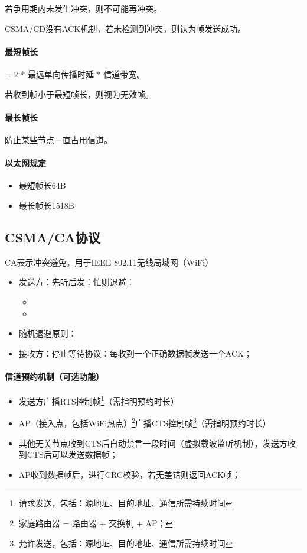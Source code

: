 若争用期内未发生冲突，则不可能再冲突。

CSMA/CD没有ACK机制，若未检测到冲突，则认为帧发送成功。

\paragraph{最短帧长}
= 2 * 最远单向传播时延 * 信道带宽。

若收到帧小于最短帧长，则视为无效帧。

\paragraph{最长帧长}
防止某些节点一直占用信道。

\paragraph{以太网规定}
\begin{itemize}
    \item 最短帧长64B
    \item 最长帧长1518B
\end{itemize}


\subsection{CSMA/CA协议}
CA表示冲突避免。用于IEEE 802.11无线局域网（WiFi）

\begin{itemize}
    \item 发送方：先听后发：忙则退避：\begin{itemize}
        \item 
        \item 
    \end{itemize}
    \item 随机退避原则：
    \item 接收方：停止等待协议：每收到一个正确数据帧发送一个ACK；
\end{itemize}

\paragraph{信道预约机制（可选功能）}
\begin{itemize}
    \item 发送方广播RTS控制帧\footnote{请求发送，包括：源地址、目的地址、通信所需持续时间}（需指明预约时长）
    \item AP（接入点，包括WiFi热点）\footnote{家庭路由器 = 路由器 + 交换机 + AP；}广播CTS控制帧\footnote{允许发送，包括：源地址、目的地址、通信所需持续时间}（需指明预约时长）
    \item 其他无关节点收到CTS后自动禁言一段时间（虚拟载波监听机制），发送方收到CTS后可以发送数据帧；
    \item AP收到数据帧后，进行CRC校验，若无差错则返回ACK帧；
\end{itemize}

